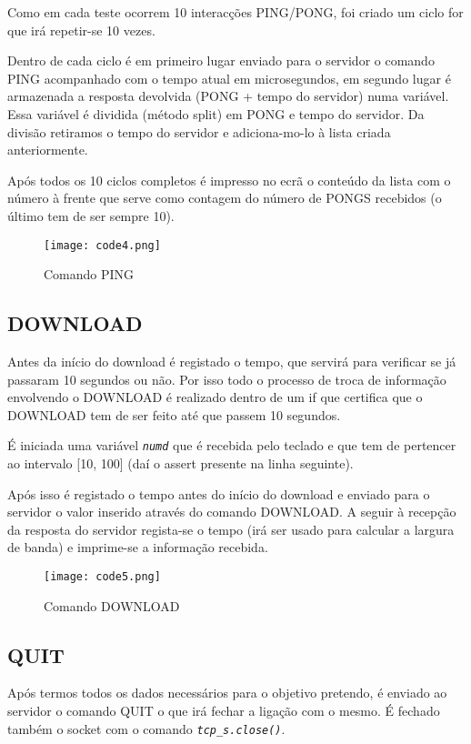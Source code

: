 \documentclass{report}
\begin{document}
Como em cada teste ocorrem 10 interacções PING/PONG, foi criado um ciclo for que irá repetir-se 10 vezes.

Dentro de cada ciclo é em primeiro lugar enviado para o servidor o comando PING acompanhado com o tempo atual em microsegundos, em segundo lugar é armazenada a resposta devolvida (PONG + tempo do servidor) numa variável. Essa variável é dividida (método split) em PONG e tempo do servidor. Da divisão retiramos o tempo do servidor e adiciona-mo-lo à lista criada anteriormente.

Após todos os 10 ciclos completos é impresso no ecrã o conteúdo da lista com o número à frente que serve como contagem do número de PONGS recebidos (o último tem de ser sempre 10).


\begin{figure}[h]
\center %
\texttt{[image: code4.png]}
\caption{Comando PING}
\label{fig:code4}
\end{figure}



\subsection{DOWNLOAD}

Antes da início do download é registado o tempo, que servirá para verificar se já passaram 10 segundos ou não. Por isso todo o processo de troca de informação envolvendo o DOWNLOAD é realizado dentro de um if que certifica que o DOWNLOAD tem de ser feito até que passem 10 segundos.

É iniciada uma variável {\itshape \texttt{numd}} que é recebida pelo teclado e que tem de pertencer ao intervalo [10, 100] (daí o assert presente na linha seguinte). 

Após isso é registado o tempo antes do início do download e enviado para o servidor o valor inserido através do comando DOWNLOAD. A seguir à recepção da resposta do servidor regista-se o tempo (irá ser usado para calcular a largura de banda) e imprime-se a informação recebida.


\begin{figure}[h]
\center %
\texttt{[image: code5.png]}
\caption{Comando DOWNLOAD}
\label{fig:code5}
\end{figure}



 \subsection{QUIT}
 Após termos todos os dados necessários para o objetivo pretendo, é enviado ao servidor o comando QUIT o que irá fechar a ligação com o mesmo. É fechado também o socket com o comando {\itshape \texttt{tcp\_s.close()}}.
 
\end{document}
